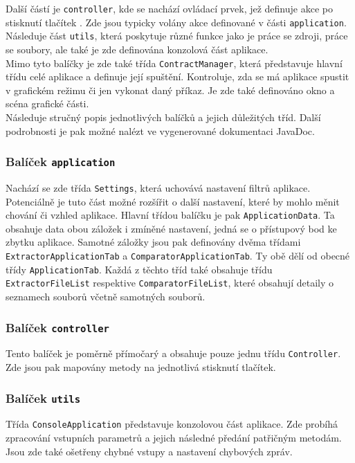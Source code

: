 			Další částí je \texttt{controller}, kde se nachází ovládací prvek, jež definuje akce po stisknutí tlačítek . Zde jsou typicky volány akce definované v části \texttt{application}.\\
			
			Následuje část \texttt{utils}, která poskytuje různé funkce jako je práce se zdroji, práce se soubory, ale také je zde definována konzolová část aplikace.\\
			
			Mimo tyto balíčky je zde také třída \texttt{ContractManager}, která představuje hlavní třídu celé aplikace a definuje její spuštění. Kontroluje, zda se má aplikace spustit v grafickém režimu či jen vykonat daný příkaz. Je zde také definováno okno a scéna grafické části.\\
			
			Následuje stručný popis jednotlivých balíčků a jejich důležitých tříd. Další podrobnosti je pak možné nalézt ve vygenerované dokumentaci JavaDoc.
					 
			
			\subsubsection{Balíček \texttt{application}}
				Nachází se zde třída \texttt{Settings}, která uchovává nastavení filtrů aplikace. Potenciálně je tuto část možné rozšířit o další nastavení, které by mohlo měnit chování či vzhled aplikace. Hlavní třídou balíčku je pak \texttt{ApplicationData}. Ta obsahuje data obou záložek i zmíněné nastavení, jedná se o přístupový bod ke zbytku aplikace. Samotné záložky jsou pak definovány dvěma třídami \texttt{ExtractorApplicationTab} a \texttt{ComparatorApplicationTab}. Ty obě dělí od obecné třídy \texttt{ApplicationTab}. Každá z těchto tříd také obsahuje třídu \texttt{ExtractorFileList} respektive \texttt{ComparatorFileList}, které obsahují detaily o seznamech souborů včetně samotných souborů.
				
			\subsubsection{Balíček \texttt{controller}}
				Tento balíček je poměrně přímočarý a obsahuje pouze jednu třídu \texttt{Controller}. Zde jsou pak mapovány metody na jednotlivá stisknutí tlačítek.
		
			\subsubsection{Balíček \texttt{utils}}
				Třída \texttt{ConsoleApplication} představuje konzolovou část aplikace. Zde probíhá zpracování vstupních parametrů a jejich následné předání patřičným metodám. Jsou zde také ošetřeny chybné vstupy a nastavení chybových zpráv.\\
				
